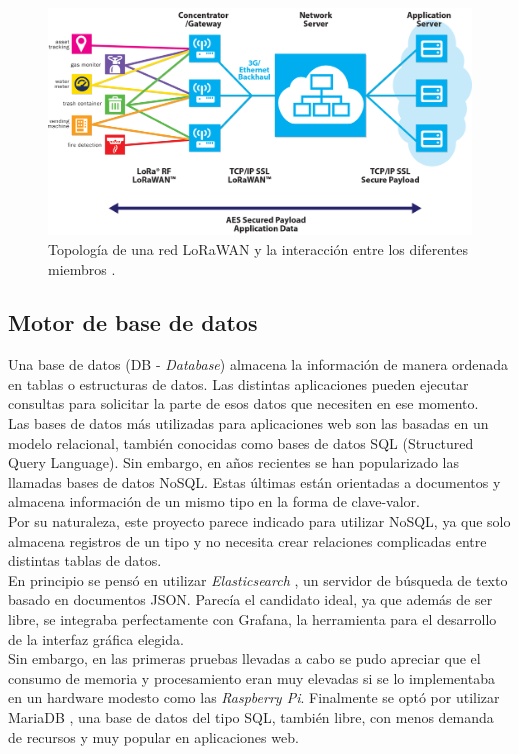 \begin{figure}[h]
	\centering
	\includegraphics[width=0.9\linewidth]{Figures/sensor-gw-architecture-lora}
	\caption{Topología de una red LoRaWAN y la interacción entre los diferentes miembros \citep{lora_alliance}.}
	\label{fig:sensor-gw-architecture-lora}
\end{figure}

\subsection{Motor de base de datos}
Una base de datos (DB - \textit{Database}) almacena la información de manera ordenada en tablas o estructuras de datos. Las distintas aplicaciones pueden ejecutar consultas para solicitar la parte de esos datos que necesiten en ese momento.\\
Las bases de datos más utilizadas para aplicaciones web son las basadas en un modelo relacional, también conocidas como bases de datos SQL (Structured Query Language). Sin embargo, en años recientes se han popularizado las llamadas bases de datos NoSQL. Estas últimas están orientadas a documentos y almacena información de un mismo tipo en la forma de clave-valor.\\
Por su naturaleza, este proyecto parece indicado para utilizar NoSQL, ya que solo almacena registros de un tipo y no necesita crear relaciones complicadas entre distintas tablas de datos.\\
En principio se pensó en utilizar \textit{Elasticsearch} \citep{elasticsearch}, un servidor de búsqueda de texto basado en documentos JSON. Parecía el candidato ideal, ya que además de ser libre, se integraba perfectamente con Grafana, la herramienta para el desarrollo de la interfaz gráfica elegida.\\
Sin embargo, en las primeras pruebas llevadas a cabo se pudo apreciar que el consumo de memoria y procesamiento eran muy elevadas si se lo implementaba en un hardware modesto como las \textit{Raspberry Pi}. Finalmente se optó por utilizar MariaDB \citep{mariadb}, una base de datos del tipo SQL, también libre, con menos demanda de recursos y muy popular en aplicaciones web.\\

